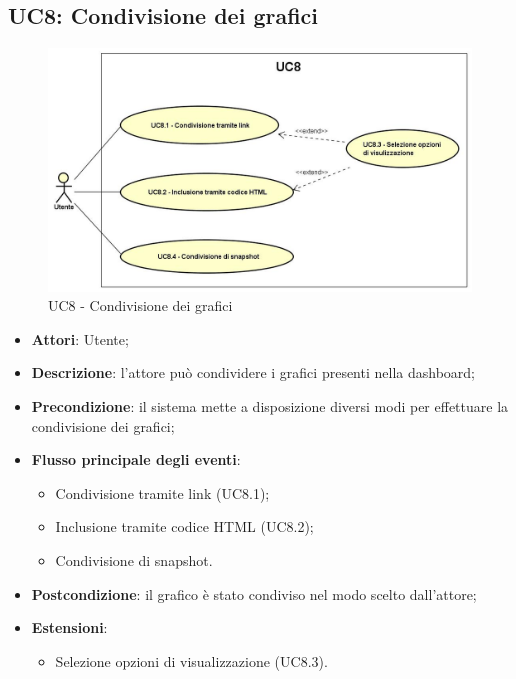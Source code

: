 \subsection{UC8: Condivisione dei grafici}
\hypertarget{UC8}{}
\begin{figure} [H]
	\centering
	\includegraphics[scale=0.45]{Img/UC8}
	\caption{UC8 - Condivisione dei grafici}\label{}
\end{figure}
\begin{itemize}
	\item \textbf{Attori}: Utente;
	\item \textbf{Descrizione}: l'attore può condividere i grafici presenti nella dashboard;
	\item \textbf{Precondizione}: il sistema mette a disposizione diversi modi per effettuare la condivisione dei grafici;
	\item \textbf{Flusso principale degli eventi}:
	\begin{itemize}
		\item Condivisione tramite link (UC8.1);
		\item Inclusione tramite codice HTML (UC8.2);	
		\item Condivisione di snapshot.
	\end{itemize}
	\item \textbf{Postcondizione}: il grafico è stato condiviso nel modo scelto dall'attore;
	\item \textbf{Estensioni}:
	\begin{itemize}
		\item Selezione opzioni di visualizzazione (UC8.3).
	\end{itemize}
	
\end{itemize}

